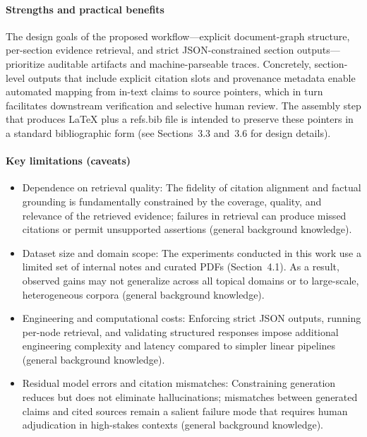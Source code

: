 \documentclass{article}%
\begin{document}
\paragraph{Strengths and practical benefits}
The design goals of the proposed workflow—explicit document-graph structure, per-section evidence retrieval, and strict JSON-constrained section outputs—prioritize auditable artifacts and machine-parseable traces. Concretely, section-level outputs that include explicit citation slots and provenance metadata enable automated mapping from in-text claims to source pointers, which in turn facilitates downstream verification and selective human review. The assembly step that produces LaTeX plus a refs.bib file is intended to preserve these pointers in a standard bibliographic form (see Sections~3.3 and~3.6 for design details).

\paragraph{Key limitations (caveats)}
\begin{itemize}
  \item Dependence on retrieval quality: The fidelity of citation alignment and factual grounding is fundamentally constrained by the coverage, quality, and relevance of the retrieved evidence; failures in retrieval can produce missed citations or permit unsupported assertions (general background knowledge).
  \item Dataset size and domain scope: The experiments conducted in this work use a limited set of internal notes and curated PDFs (Section~4.1). As a result, observed gains may not generalize across all topical domains or to large-scale, heterogeneous corpora (general background knowledge).
  \item Engineering and computational costs: Enforcing strict JSON outputs, running per-node retrieval, and validating structured responses impose additional engineering complexity and latency compared to simpler linear pipelines (general background knowledge).
  \item Residual model errors and citation mismatches: Constraining generation reduces but does not eliminate hallucinations; mismatches between generated claims and cited sources remain a salient failure mode that requires human adjudication in high-stakes contexts (general background knowledge).
\end{itemize}
\end{document}
